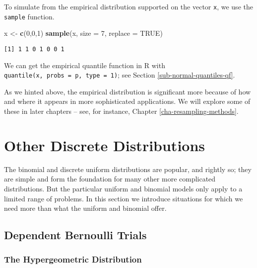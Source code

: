 \documentclass[]{book}
\newenvironment{Shaded}{\begin{snugshade}}{\end{snugshade}}
\newcommand{\KeywordTok}[1]{\textcolor[rgb]{0.13,0.29,0.53}{\textbf{{#1}}}}
\newcommand{\DataTypeTok}[1]{\textcolor[rgb]{0.13,0.29,0.53}{{#1}}}
\newcommand{\DecValTok}[1]{\textcolor[rgb]{0.00,0.00,0.81}{{#1}}}
\newcommand{\StringTok}[1]{\textcolor[rgb]{0.31,0.60,0.02}{{#1}}}
\newcommand{\OtherTok}[1]{\textcolor[rgb]{0.56,0.35,0.01}{{#1}}}
\newcommand{\NormalTok}[1]{{#1}}
\numberwithin{equation}{chapter}
\numberwithin{figure}{chapter}
\theoremstyle{plain}
\theoremstyle{definition}
\theoremstyle{remark}
\theoremstyle{definition}
\theoremstyle{definition}
\theoremstyle{remark}
\begin{document}
To simulate from the empirical distribution supported on the vector
\texttt{x}, we use the \texttt{sample} 
function.

\begin{Shaded}
\begin{Highlighting}[]
\NormalTok{x <-}\StringTok{ }\KeywordTok{c}\NormalTok{(}\DecValTok{0}\NormalTok{,}\DecValTok{0}\NormalTok{,}\DecValTok{1}\NormalTok{)}
\KeywordTok{sample}\NormalTok{(x, }\DataTypeTok{size =} \DecValTok{7}\NormalTok{, }\DataTypeTok{replace =} \OtherTok{TRUE}\NormalTok{)}
\end{Highlighting}
\end{Shaded}

\begin{verbatim}
[1] 1 1 0 1 0 0 1
\end{verbatim}

We can get the empirical quantile function in R with
\texttt{quantile(x,\ probs\ =\ p,\ type\ =\ 1)}; see Section
\ref{sub-normal-quantiles-qf}.

As we hinted above, the empirical distribution is significant more
because of how and where it appears in more sophisticated applications.
We will explore some of these in later chapters -- see, for instance,
Chapter \ref{cha-resampling-methods}.

\section{Other Discrete
Distributions}\label{sec-other-discrete-distributions}

The binomial and discrete uniform distributions are popular, and rightly
so; they are simple and form the foundation for many other more
complicated distributions. But the particular uniform and binomial
models only apply to a limited range of problems. In this section we
introduce situations for which we need more than what the uniform and
binomial offer.

\subsection{Dependent Bernoulli Trials}\label{sec-non-bernoulli-trials}

\subsubsection{The Hypergeometric
Distribution}\label{sub-hypergeometric-dist}
\end{document}
